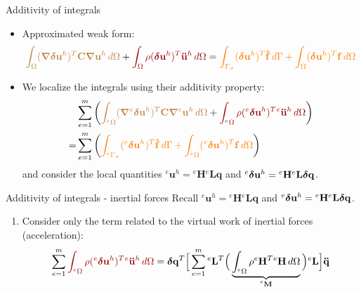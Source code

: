 \documentclass[aspectratio=169]{beamer}
\begin{document}
\begin{frame}{Additivity of integrals}
  \begin{itemize}
    \item  Approximated weak form:
          $${\color{brown}\int_{\Omega} (\boldsymbol{\nabla} \bolddelta\mathbf u^{h} )^{T} \mathbf C\boldsymbol{\nabla} \mathbf u^{h}\, d\Omega}+{\color{darkred}\int_{\Omega} \rho(\bolddelta\mathbf u^{h})^{T}\mathbf{\ddot{u}}^{h}\, d\Omega}= {\color{orange}\int_{\Gamma_\sigma} (\bolddelta\mathbf u^{h})^{T}\mathbf{\hat f} \, d\Gamma+\int_{\Omega}  (\bolddelta\mathbf u^{h})^{T}\mathbf f\, d\Omega}$$
    \item  We localize the integrals using their additivity property:
          \begin{align*}
              & \sum_{e=1}^m\left({\color{brown}\int_{{}^e\Omega} (\boldsymbol{\nabla} {}^e\bolddelta\mathbf u^{h} )^{T} \mathbf C\boldsymbol{\nabla} {}^e\mathbf u^{h}\, d\Omega}+{\color{darkred}\int_{{}^e\Omega} \rho({}^e\bolddelta\mathbf u^{h})^{T}{}^e\mathbf{\ddot{u}}^{h}\, d\Omega}\right) \\
            = & \sum_{e=1}^m\left({\color{orange}\int_{{}^e\Gamma_\sigma} ({}^e\bolddelta\mathbf u^{h})^{T}\mathbf{\hat f} \, d\Gamma+\int_{{}^e\Omega}  ({}^e\bolddelta\mathbf u^{h})^{T}\mathbf f\, d\Omega}\right)
          \end{align*}
          and consider the local quantities $^e\mathbf u^h={}^e\mathbf H{}^e\mathbf L \mathbf q$ and ${}^e \boldsymbol\delta \mathbf{u}^h = {}^e\mathbf{H}{}^e\mathbf L \boldsymbol\delta\mathbf{q}$.
  \end{itemize}
\end{frame}

\begin{frame}{Additivity of integrals - inertial forces}
  Recall $^e\mathbf u^h={}^e\mathbf H{}^e\mathbf L \mathbf q$ and ${}^e \boldsymbol\delta \mathbf{u}^h = {}^e\mathbf{H}{}^e\mathbf L \boldsymbol\delta\mathbf{q}$.
  \vspace{0.5cm}
  \begin{enumerate}
    \item  Consider only the term related to the virtual work of inertial forces (acceleration):
          \[
            \sum_{e=1}^m {\color{darkred}\int_{{}^e\Omega}\rho({}^e\bolddelta\mathbf u^{h})^{T}{}^e\mathbf{\ddot{u}}^{h}\, d\Omega}  =\bolddelta\mathbf{q}^T \Big[\sum_{e=1}^m {}^e\mathbf L^T\Big(\underbrace{\int_{{}^e\Omega} \rho{}^e\mathbf H^{T}{}^e\mathbf H\, d\Omega}_\text{${}^e\mathbf M$}\Big) {}^e\mathbf L\Big] \mathbf{\ddot{q}}
          \]
  \end{enumerate}
\end{frame}
\end{document}
